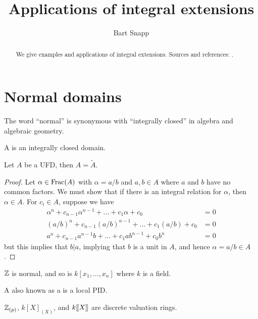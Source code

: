 \documentclass{ximera}
\author{Bart Snapp}
\title{Applications of integral extensions}
\begin{document}
\begin{abstract}
  We give examples and applications of integral extensions. Sources
  and references: \cite{GP2008,jpS2000}.
\end{abstract}
\maketitle



\section{Normal domains}
The word ``normal'' is synonymous with ``integrally closed'' in algebra and algebraic geometry.

\begin{definition}
  A  is an integrally closed domain.
\end{definition}



\begin{theorem}
  Let $A$ be a UFD, then $A = \tilde{A}$.
  \begin{proof}
    Let $\alpha \in \operatorname{Frac}(A)$ with $\alpha = a/b$ and $a,b\in A$ where
    $a$ and $b$ have no common factors.  We must show that if there is
    an integral relation for $\alpha$, then $\alpha\in A$. For $c_i\in
    A$, suppose we have
    \begin{align*}
      \alpha^n + c_{n-1} \alpha^{n-1}+ \dots + c_1 \alpha + c_0 &= 0 \\
      (a/b)^n + c_{n-1} (a/b)^{n-1}+ \dots + c_1 (a/b) + c_0 &= 0 \\
      a^n + c_{n-1} a^{n-1}b+ \dots + c_1 ab^{n-1} + c_0b^n &= 0
    \end{align*}
    but this implies that $b|a$, implying that $b$ is a unit in $A$,
    and hence $\alpha = a/b\in A$.
  \end{proof}
\end{theorem}

\begin{corollary}
  $\mathbb Z$ is normal, and so is $k[x_1,\dots,x_n]$ where $k$ is a field.
\end{corollary}


\begin{definition}
  A  also known as a  is a local
  PID.
\end{definition}

\begin{example}
  $\mathbb Z_{(p)}$, $k[X]_{(X)}$, and $k[\hspace{-0.25ex}[ X]\hspace{-0.25ex}]$ are discrete valuation
  rings.
\end{example}
\end{document}
